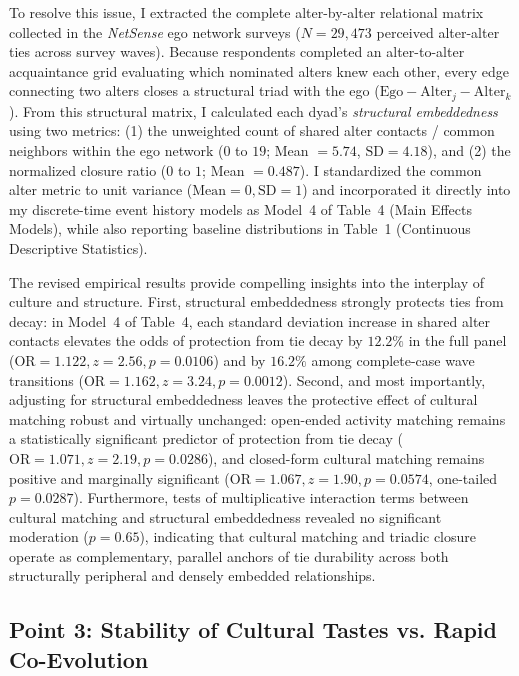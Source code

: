 \documentclass[11pt]{article}
\begin{document}
To resolve this issue, I extracted the complete alter-by-alter relational matrix collected in the \textit{NetSense} ego network surveys ($N = 29,473$ perceived alter-alter ties across survey waves). Because respondents completed an alter-to-alter acquaintance grid evaluating which nominated alters knew each other, every edge connecting two alters closes a structural triad with the ego ($\text{Ego} - \text{Alter}_j - \text{Alter}_k$). From this structural matrix, I calculated each dyad's \textit{structural embeddedness} using two metrics: (1) the unweighted count of shared alter contacts / common neighbors within the ego network ($0$ to $19$; Mean $= 5.74$, $\text{SD} = 4.18$), and (2) the normalized closure ratio ($0$ to $1$; Mean $= 0.487$). I standardized the common alter metric to unit variance ($\text{Mean} = 0, \text{SD} = 1$) and incorporated it directly into my discrete-time event history models as Model~4 of Table~4 (Main Effects Models), while also reporting baseline distributions in Table~1 (Continuous Descriptive Statistics).

The revised empirical results provide compelling insights into the interplay of culture and structure. First, structural embeddedness strongly protects ties from decay: in Model~4 of Table~4, each standard deviation increase in shared alter contacts elevates the odds of protection from tie decay by $12.2\%$ in the full panel ($\text{OR} = 1.122, z = 2.56, p = 0.0106$) and by $16.2\%$ among complete-case wave transitions ($\text{OR} = 1.162, z = 3.24, p = 0.0012$). Second, and most importantly, adjusting for structural embeddedness leaves the protective effect of cultural matching robust and virtually unchanged: open-ended activity matching remains a statistically significant predictor of protection from tie decay ($\text{OR} = 1.071, z = 2.19, p = 0.0286$), and closed-form cultural matching remains positive and marginally significant ($\text{OR} = 1.067, z = 1.90, p = 0.0574$, one-tailed $p = 0.0287$). Furthermore, tests of multiplicative interaction terms between cultural matching and structural embeddedness revealed no significant moderation ($p = 0.65$), indicating that cultural matching and triadic closure operate as complementary, parallel anchors of tie durability across both structurally peripheral and densely embedded relationships.

\subsection*{Point 3: Stability of Cultural Tastes vs. Rapid Co-Evolution}
\end{document}
